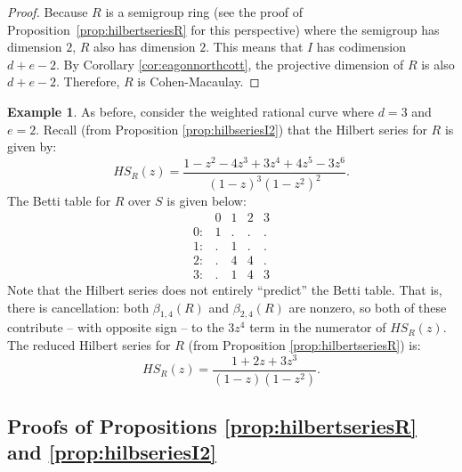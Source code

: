 \documentclass[12pt,reqno]{amsart}
\theoremstyle{definition}
\newtheorem{example}[theorem]{Example}
\theoremstyle{remark}
\begin{document}
\begin{proof}
Because $R$ is a semigroup ring (see the proof of Proposition~\ref{prop:hilbertseriesR} for this perspective) where the semigroup has dimension $2$, $R$ also has dimension $2$. This means that $I$ has codimension $d+e-2$. By Corollary \ref{cor:eagonnorthcott}, the projective dimension of $R$ is also $d+e-2$.  Therefore, $R$ is Cohen-Macaulay.
\end{proof}

\begin{example}
As before, consider the weighted rational curve where $d=3$ and $e=2$.  Recall (from Proposition \ref{prop:hilbseriesI2}) that the Hilbert series for $R$ is given by:
\[
HS_R(z) = \frac{1-z^2-4z^3+3z^4+4z^5-3z^6}{(1-z)^3(1-z^2)^2}.
\]
The Betti table for $R$ over $S$ is given below:
\[\begin{matrix}
 & 0 & 1 & 2 & 3\\
0: & 1 & . & . & .\\
1: & . & 1 & . & .\\
2: & . & 4 & 4 & .\\
3: & . & 1 & 4 & 3
\end{matrix}\]
Note that the Hilbert series does not entirely ``predict'' the Betti table.  That is, there is cancellation: both $\beta_{1,4}(R)$ and $\beta_{2,4}(R)$ are nonzero, so both of these contribute -- with opposite sign -- to the $3z^4$ term in the numerator of $HS_R(z)$. The reduced Hilbert series for $R$ (from Proposition \ref{prop:hilbertseriesR}) is:
\[
HS_R(z) = \frac{1+2z+3z^3}{(1-z)(1-z^2)}.
\]
\end{example}

\subsection{Proofs of Propositions \ref{prop:hilbertseriesR} and \ref{prop:hilbseriesI2}}
\label{subsec:proofs}
\end{document}
